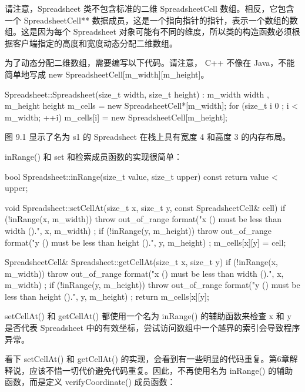 请注意，Spreadsheet 类不包含标准的二维 SpreadsheetCell 数组。相反，它包含一个 SpreadsheetCell** 数据成员，这是一个指向指针的指针，表示一个数组的数组。这是因为每个 Spreadsheet 对象可能有不同的维度，所以类的构造函数必须根据客户端指定的高度和宽度动态分配二维数组。

为了动态分配二维数组，需要编写以下代码。请注意， C++ 不像在 Java，不能简单地写成 new SpreadsheetCell[m\_width][m\_height]。

\begin{cpp}
Spreadsheet::Spreadsheet(size_t width, size_t height)
: m_width { width }, m_height { height }
{
    m_cells = new SpreadsheetCell*[m_width];
    for (size_t i { 0 }; i < m_width; ++i) {
        m_cells[i] = new SpreadsheetCell[m_height];
    }
}
\end{cpp}

图 9.1 显示了名为 s1 的 Spreadsheet 在栈上具有宽度 4 和高度 3 的内存布局。


inRange() 和 set 和检索成员函数的实现很简单：

\begin{cpp}
bool Spreadsheet::inRange(size_t value, size_t upper) const
{
    return value < upper;
}

void Spreadsheet::setCellAt(size_t x, size_t y, const SpreadsheetCell& cell)
{
    if (!inRange(x, m_width)) {
        throw out_of_range {
            format("x ({}) must be less than width ({}).", x, m_width) };
    }
    if (!inRange(y, m_height)) {
        throw out_of_range {
            format("y ({}) must be less than height ({}).", y, m_height) };
    }
    m_cells[x][y] = cell;
}

SpreadsheetCell& Spreadsheet::getCellAt(size_t x, size_t y)
{
    if (!inRange(x, m_width)) {
        throw out_of_range {
            format("x ({}) must be less than width ({}).", x, m_width) };
    }
    if (!inRange(y, m_height)) {
        throw out_of_range {
            format("y ({}) must be less than height ({}).", y, m_height) };
    }
    return m_cells[x][y];
}
\end{cpp}

setCellAt() 和 getCellAt() 都使用一个名为 inRange() 的辅助函数来检查 x 和 y 是否代表 Spreadsheet 中的有效坐标，尝试访问数组中一个越界的索引会导致程序异常。

看下 setCellAt() 和 getCellAt() 的实现，会看到有一些明显的代码重复。第6章解释说，应该不惜一切代价避免代码重复。因此，不再使用名为 inRange() 的辅助函数，而是定义 verifyCoordinate() 成员函数：

